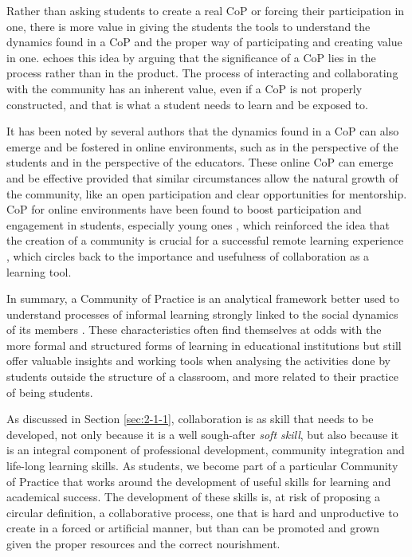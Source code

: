 Rather than asking students to create a real \ac{CoP} or forcing their participation in one, there is more value in giving the students the tools to understand the dynamics found in a \ac{CoP} and the proper way of participating and creating value in one. \textcite{keay_2016}
echoes this idea by arguing that the significance of a \ac{CoP} lies in the process rather than in the product. The process of interacting and collaborating with the community has an inherent value, even if a \ac{CoP} is not properly constructed, and that is what a student
needs to learn and be exposed to.

It has been noted by several authors that the dynamics found in a \ac{CoP} can also emerge and be fostered in online environments, such as \textcite{riverin_2008} in the perspective of the students and \textcite{kirschner_2007} in the perspective of the educators. These online \ac{CoP}
can emerge and be effective provided that similar circumstances allow the natural growth of the community, like an open participation and clear opportunities for mentorship. \ac{CoP} for online environments have been found to boost participation and engagement in students, especially
young ones \parencite{thomas_2005}, which reinforced the idea that the creation of a community is crucial for a successful remote learning experience \parencite{swan_2002,archambault_2022}, which circles back to the importance and usefulness of collaboration as a learning tool.

In summary, a Community of Practice is an analytical framework better used to understand processes of informal learning strongly linked to the social dynamics of its members \parencite{wenger_1998}. These characteristics often find themselves at odds with the more formal and
structured forms of learning in educational institutions but still offer valuable insights and working tools when analysing the activities done by students outside the structure of a classroom, and more related to their practice of being students.

As discussed in Section \ref{sec:2-1-1}, collaboration is as skill that needs to be developed, not only because it is a well sough-after \emph{soft skill}, but also because it is an integral component of professional development, community integration
and life-long learning skills. As students, we become part of a particular Community of Practice that works around the development of useful skills for learning and academical success. The development of these skills is, at risk of proposing a circular definition, a collaborative
process, one that is hard and unproductive to create in a forced or artificial manner, but than can be promoted and grown given the proper resources and the correct nourishment.


